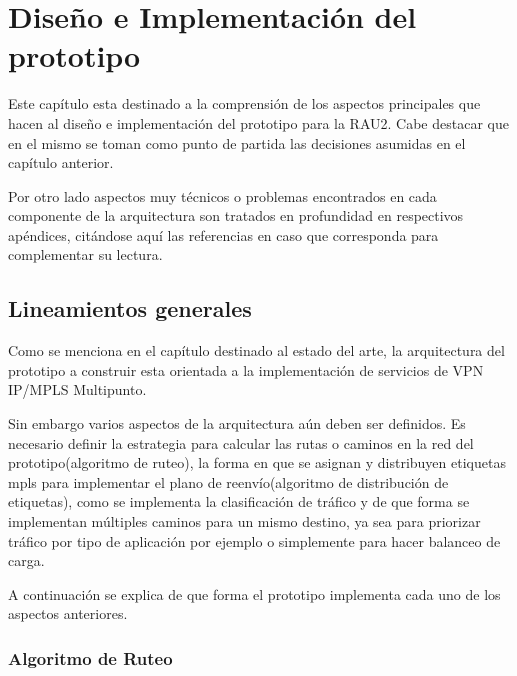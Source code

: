 \chapter{Dise\~no e Implementaci\'on del prototipo}

\ifpdf
    \graphicspath{{Chapter4/Figs/Raster/}{Chapter4/Figs/PDF/}{Chapter4/Figs/}}
\else
    \graphicspath{{Chapter4/Figs/Vector/}{Chapter4/Figs/}}
\fi

Este cap\'itulo esta destinado a la comprensi\'on de los aspectos principales que hacen al dise\~no e implementaci\'on del prototipo para la RAU2. Cabe destacar que en el mismo se toman como punto de partida las decisiones asumidas en el cap\'itulo anterior.

Por otro lado aspectos muy t\'ecnicos o problemas encontrados en cada componente de la arquitectura son tratados en profundidad en respectivos ap\'endices, citándose aquí las referencias en caso que corresponda para complementar su lectura.\\

\section[Lineamientos generales]{Lineamientos generales}

Como se menciona en el cap\'itulo destinado al estado del arte, la arquitectura del prototipo a construir esta orientada a la implementaci\'on de servicios de VPN IP/MPLS Multipunto.

Sin embargo varios aspectos de la arquitectura a\'un deben ser definidos. Es necesario definir la estrategia para calcular las rutas o caminos en la red del prototipo(algoritmo de ruteo), la forma en que se asignan y distribuyen etiquetas mpls para implementar el plano de reenvío(algoritmo de distribución de etiquetas), como se implementa la clasificaci\'on de tr\'afico y de que forma se implementan múltiples caminos para un mismo destino, ya sea para priorizar tr\'afico por tipo de aplicaci\'on por ejemplo o simplemente para hacer balanceo de carga. 

A continuaci\'on se explica de que forma el prototipo implementa cada uno de los aspectos anteriores.

\subsection{Algoritmo de Ruteo}

